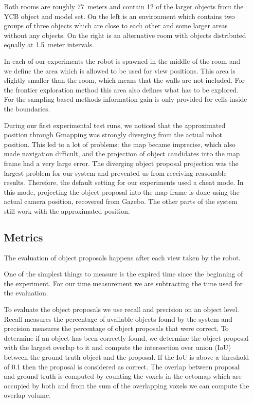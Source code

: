 \documentclass[a4paper,11pt,english]{article}
\begin{document}
Both rooms are roughly \num{7}\texttimes\num{7}~meters and contain \num{12} of the larger objects from the YCB object and model set\cite{calli2015benchmarking}.
On the left is an environment which contains two groups of three objects which are close to each other and some larger areas without any objects.
On the right is an alternative room with objects distributed equally at \num{1.5}~meter intervals.

In each of our experiments the robot is spawned in the middle of the room and we define the area which is allowed to be used for view positions. This area is slightly smaller than the room, which means that the walls are not included.
For the frontier exploration method this area also defines what has to be explored.
For the sampling based methods information gain is only provided for cells inside the boundaries.

During our first experimental test runs, we noticed that the approximated position through Gmapping was strongly diverging from the actual robot position.
This led to a lot of problems: the map became imprecise, which also made navigation difficult, and the projection of object candidates into the map frame had a very large error.
The diverging object proposal projection was the largest problem for our system and prevented us from receiving reasonable results.
Therefore, the default setting for our experiments used a \glqq{}cheat mode\grqq{}.
In this mode, projecting the object proposal into the map frame is done using the actual camera position, recovered from Gazebo.
The other parts of the system still work with the approximated position.

\subsection{Metrics}
The evaluation of object proposals happens after each view taken by the robot.

One of the simplest things to measure is the expired time since the beginning of the experiment.
For our time measurement we are subtracting the time used for the evaluation.

To evaluate the object proposals we use recall and precision on an object level.
Recall measures the percentage of available objects found by the system and precision measures the percentage of object proposals that were correct.
To determine if an object has been correctly found, we determine the object proposal with the largest overlap to it and compute the intersection over union (IoU) between the ground truth object and the proposal.
If the IoU is above a threshold of \num{0.1} then the proposal is considered as correct.
The overlap between proposal and ground truth is computed by counting the voxels in the octomap which are occupied by both and from the sum of the overlapping voxels we can compute the overlap volume.
\end{document}
